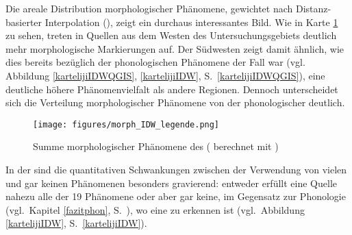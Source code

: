 Die areale Distribution morphologischer Phänomene, gewichtet nach Distanz-basierter Interpolation (), zeigt ein durchaus interessantes Bild. Wie in Karte \ref{karteIDWMORPH} zu sehen, treten in Quellen aus dem  Westen des Untersuchungsgebiets deutlich mehr morphologische Markierungen auf. Der Südwesten zeigt damit ähnlich, wie dies bereits bezüglich der phonologischen Phänomene der Fall war (vgl.\, Abbildung \ref{kartelijiIDWQGIS}, \ref{kartelijiIDW}, S.\, \ref{kartelijiIDWQGIS}), eine deutliche höhere Phänomenvielfalt als andere Regionen. Dennoch unterscheidet sich die Verteilung morphologischer Phänomene von der phonologischer deutlich. 

\begin{figure} 

\texttt{[image: figures/morph\_IDW\_legende.png]}
		\caption{\label{karteIDWMORPH} Summe morphologischer Phänomene des  ( berechnet mit )}
		\end{figure}
  

In der  sind die quantitativen Schwankungen zwischen der Verwendung von vielen und gar keinen Phänomenen besonders gravierend: entweder erfüllt eine Quelle nahezu alle der 19 Phänomene oder aber gar keine, im Gegensatz zur Phonologie (vgl.\, Kapitel \ref{fazitphon}, S.\, \pageref{fazitphon}), wo eine  zu erkennen ist (vgl.\, Abbildung \ref{kartelijiIDW}, S.\, \ref{kartelijiIDW}). 